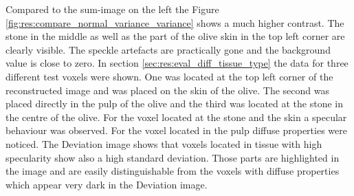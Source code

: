 Compared to the sum-image on the left the Figure \ref{fig:res:compare_normal_variance_variance} shows a much higher contrast. The stone in the middle as well as the part of the olive skin in the top left corner are clearly visible. The speckle artefacts are practically gone and the background value is close to zero. In section \ref{sec:res:eval_diff_tissue_type} the data for three different test voxels were shown. One was located at the top left corner of the reconstructed image and was placed on the skin of the olive. The second was placed directly in the pulp of the olive and the third was located at the stone in the centre of the olive. For the voxel located at the stone and the skin a specular behaviour was observed. For the voxel located in the pulp diffuse properties were noticed. The Deviation image shows that voxels located in tissue with high specularity show also a high standard deviation. Those parts are highlighted in the image and are easily distinguishable from the voxels with diffuse properties which appear very dark in the Deviation image. 


